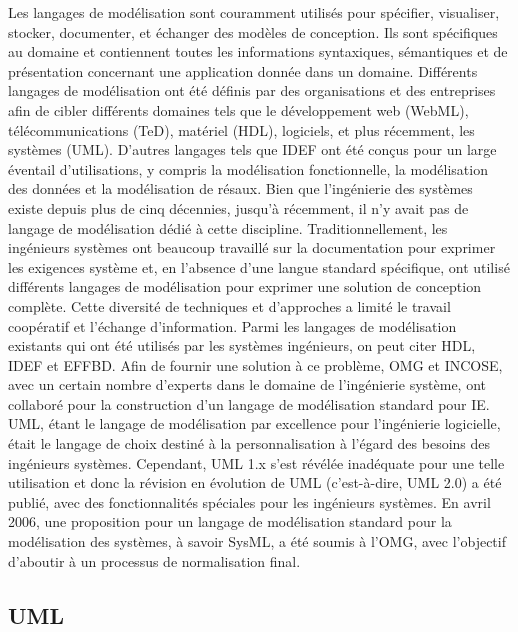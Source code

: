 \documentclass[french]{spimufcphdthesis}
\begin{document}
 Les langages de modélisation sont couramment utilisés pour spécifier, visualiser, stocker, documenter, et échanger des modèles de conception. Ils sont spécifiques au domaine et contiennent toutes les informations syntaxiques, sémantiques et de présentation concernant une application donnée dans un domaine. Différents langages de modélisation ont été définis par des organisations et des entreprises afin de cibler différents domaines tels que le développement web (WebML), télécommunications (TeD), matériel (HDL), logiciels, et plus récemment, les systèmes (UML). D'autres langages tels que IDEF ont été conçus pour un large éventail d'utilisations, y compris la modélisation fonctionnelle, la modélisation des données et la modélisation de résaux.
Bien que l’ingénierie des systèmes existe depuis plus de cinq décennies, jusqu'à récemment, il n'y avait pas de langage de modélisation dédié à cette discipline. Traditionnellement, les ingénieurs systèmes ont beaucoup travaillé sur la documentation pour exprimer les exigences système et, en l'absence d'une langue standard spécifique, ont utilisé différents langages de modélisation pour exprimer une solution de conception complète.
Cette diversité de techniques et d'approches a limité le travail coopératif et l'échange d’information. Parmi les langages de modélisation existants qui ont été utilisés par les systèmes ingénieurs, on peut citer HDL, IDEF et EFFBD. Afin de fournir une solution à ce problème, OMG et INCOSE, avec un certain nombre d'experts dans le domaine de l’ingénierie système, ont collaboré pour la construction d'un langage de modélisation standard pour IE.
UML, étant le langage de modélisation par excellence pour l'ingénierie logicielle, était le langage de choix destiné à la personnalisation à l'égard des besoins des ingénieurs systèmes. Cependant, UML 1.x s'est révélée inadéquate pour une telle utilisation et donc la révision en évolution de UML (c'est-à-dire, UML 2.0) a été publié, avec des fonctionnalités spéciales pour les ingénieurs systèmes. En avril 2006, une proposition pour un langage de modélisation standard pour la modélisation des systèmes, à savoir SysML, a été soumis à l'OMG, avec l'objectif d'aboutir à un processus de normalisation final.

\subsection{UML}
\end{document}
